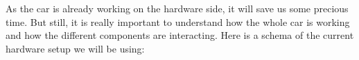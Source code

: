 \documentclass[12pt]{article}
\begin{document}
As the car is already working on the hardware side, it will save us some precious time. But still, it is really important to understand how the whole car is working and how the different components are interacting.
Here is a schema of the current hardware setup we will be using:
\newpage

\end{document}

